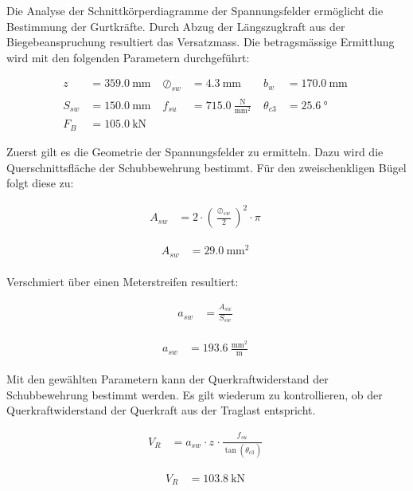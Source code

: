 \documentclass[
  11pt,
  letterpaper,
]{scrreprt}
\begin{document}
Die Analyse der Schnittkörperdiagramme der Spannungsfelder ermöglicht
die Bestimmung der Gurtkräfte. Durch Abzug der Längszugkraft aus der
Biegebeanspruchung resultiert das Versatzmass. Die betragsmässige
Ermittlung wird mit den folgenden Parametern durchgeführt:

$$
\begin{aligned}
z_{_{}} &= 359.0\ \mathrm{mm} \; 
 &\oslash_{sw_{_{}}} &= 4.3\ \mathrm{mm} \; 
 &b_{w_{_{}}} &= 170.0\ \mathrm{mm} \; 
\\[11pt]
 S_{sw_{_{}}} &= 150.0\ \mathrm{mm} \; 
 &f_{su_{_{}}} &= 715.0\ \frac{\mathrm{N}}{\mathrm{mm}^{2}} \; 
 &\theta_{c3_{_{}}} &= 25.6\ \mathrm{°} \; 
\\[11pt]
 F_{B} &= 105.0\ \mathrm{kN} \;
\end{aligned}
$$

Zuerst gilt es die Geometrie der Spannungsfelder zu ermitteln. Dazu wird
die Querschnittsfläche der Schubbewehrung bestimmt. Für den
zweischenkligen Bügel folgt diese zu:

$$
\begin{aligned}
A_{sw_{_{}}} &= 2 \cdot \left( \frac{ \oslash_{sw_{_{}}} }{ 2 } \right) ^{ 2 } \cdot \pi \; 
\end{aligned}
$$

$$
\begin{aligned}
A_{sw_{_{}}} &= 29.0\ \mathrm{mm}^{2} \;
\end{aligned}
$$

Verschmiert über einen Meterstreifen resultiert:

$$
\begin{aligned}
a_{sw_{_{}}} &= \frac{ A_{sw_{_{}}} }{ S_{sw_{_{}}} } \; 
\end{aligned}
$$

$$
\begin{aligned}
a_{sw_{_{}}} &= 193.6\ \frac{\mathrm{mm}^{2}}{\mathrm{m}} \;
\end{aligned}
$$

Mit den gewählten Parametern kann der Querkraftwiderstand der
Schubbewehrung bestimmt werden. Es gilt wiederum zu kontrollieren, ob
der Querkraftwiderstand der Querkraft aus der Traglast entspricht.

$$
\begin{aligned}
V_{R_{_{}}} &= a_{sw_{_{}}} \cdot z_{_{}} \cdot \frac{ f_{su_{_{}}} }{ \tan \left( \theta_{c3_{_{}}} \right) } \; 
\end{aligned}
$$

$$
\begin{aligned}
V_{R_{_{}}} &= 103.8\ \mathrm{kN} \;
\end{aligned}
$$
\end{document}
